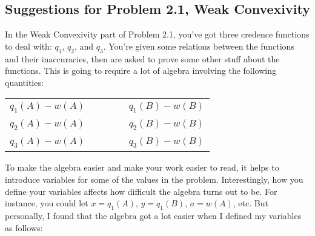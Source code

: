\documentclass[leqno,12pt]{article}
\begin{document}
\subsection{Suggestions for Problem 2.1, Weak Convexivity}
In the Weak Convexivity part of Problem 2.1, you've got three credence functions to deal with: $q_1$, $q_2$, and $q_3$. You're given some relations between the functions and their inaccuracies, then are asked to prove some other stuff about the functions. This is going to require a lot of algebra involving the following quantities:
\begin{center}
\begin{tabular} {c c c}
$q_1(A)-w(A)$		&\ \ \ \ \ 		&$q_1(B)-w(B)$ \\
$q_2(A)-w(A)$		&\ \ \ \ \ 		&$q_2(B)-w(B)$ \\
$q_3(A)-w(A)$		&\ \ \ \ \ 		&$q_3(B)-w(B)$
\end{tabular}
\end{center}
To make the algebra easier and make your work easier to read, it helps to introduce variables for some of the values in the problem. Interestingly, how you define your variables affects how difficult the algebra turns out to be. For instance, you could let $x=q_1(A)$, $y=q_1(B)$, $a=w(A)$, etc. But personally, I found that the algebra got a lot easier when I defined my variables as follows:
\end{document}
